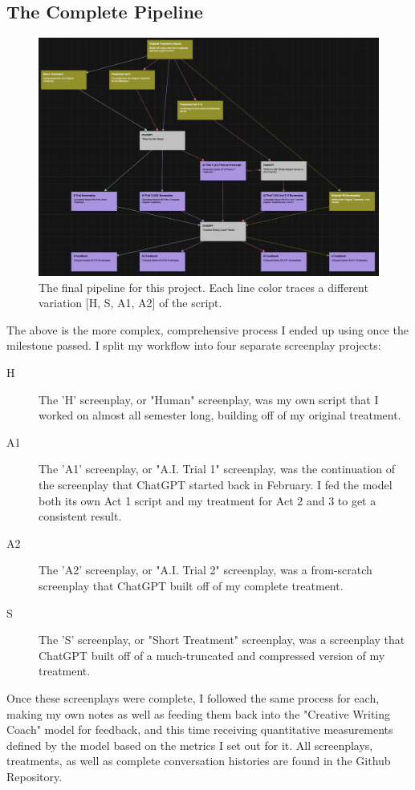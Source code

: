 \documentclass[sigconf]{acmart}
\begin{document}
\subsection{The Complete Pipeline}
\begin{figure}[!hbt]
    \centering
    \includegraphics[width=0.8\linewidth]{images/FinalPipeline.png}
    \caption{The final pipeline for this project. Each line color traces a different variation [H, S, A1, A2] of the script.}
    \label{fig:final-pipeline}
\end{figure}
\indent The above is the more complex, comprehensive process I ended up using once the milestone passed. I split my workflow into four separate screenplay projects:
\begin{description}
    \item[H] The 'H' screenplay, or "Human" screenplay, was my own script that I worked on almost all semester long, building off of my original treatment.
    \item[A1] The 'A1' screenplay, or "A.I. Trial 1" screenplay, was the continuation of the screenplay that ChatGPT started back in February. I fed the model both its own Act 1 script and my treatment for Act 2 and 3 to get a consistent result.
    \item[A2] The 'A2' screenplay, or "A.I. Trial 2" screenplay, was a from-scratch screenplay that ChatGPT built off of my complete treatment.
    \item[S] The 'S' screenplay, or "Short Treatment" screenplay, was a screenplay that ChatGPT built off of a much-truncated and compressed version of my treatment.
\end{description}

Once these screenplays were complete, I followed the same process for each, making my own notes as well as feeding them back into the "Creative Writing Coach" model for feedback, and this time receiving quantitative measurements defined by the model based on the metrics I set out for it. All screenplays, treatments, as well as complete conversation histories are found in the Github Repository.
\end{document}

